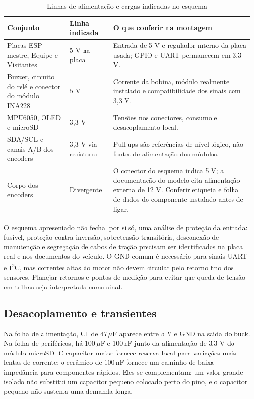 \begin{table}[htbp]\centering\small
\caption{Linhas de alimentação e cargas indicadas no esquema}\label{tab:alimentacao-modulos}
\begin{tabularx}{\textwidth}{@{}p{3.6cm}p{2.0cm}X@{}}\toprule
Conjunto & Linha indicada & O que conferir na montagem\\\midrule
Placas ESP mestre, Equipe e Visitantes & 5 V na placa & Entrada de 5 V e regulador interno da placa usada; GPIO e UART permanecem em 3,3 V.\\
Buzzer, circuito do relé e conector do módulo INA228 & 5 V & Corrente da bobina, módulo realmente instalado e compatibilidade dos sinais com 3,3 V.\\
MPU6050, OLED e microSD & 3,3 V & Tensões nos conectores, consumo e desacoplamento local.\\
SDA/SCL e canais A/B dos encoders & 3,3 V via resistores & Pull-ups são referências de nível lógico, não fontes de alimentação dos módulos.\\
Corpo dos encoders & Divergente & O conector do esquema indica 5 V; a documentação do modelo cita alimentação externa de 12 V. Conferir etiqueta e folha de dados do componente instalado antes de ligar.\\\bottomrule
\end{tabularx}\end{table}

O esquema apresentado não fecha, por si só, uma análise de proteção da entrada: fusível, proteção contra inversão, sobretensão transitória, desconexão de manutenção e segregação de cabos de tração precisam ser identificados na placa real e nos documentos do veículo. O GND comum é necessário para sinais UART e I\textsuperscript{2}C, mas correntes altas do motor não devem circular pelo retorno fino dos sensores. Planejar retornos e pontos de medição para evitar que queda de tensão em trilhas seja interpretada como sinal.

\subsection{Desacoplamento e transientes}
Na folha de alimentação, C1 de 47\,$\mu$F aparece entre 5 V e GND na saída do buck. Na folha de periféricos, há 100\,$\mu$F e 100\,nF junto da alimentação de 3,3 V do módulo microSD. O capacitor maior fornece reserva local para variações mais lentas de corrente; o cerâmico de 100\,nF fornece um caminho de baixa impedância para componentes rápidos. Eles se complementam: um valor grande isolado não substitui um capacitor pequeno colocado perto do pino, e o capacitor pequeno não sustenta uma demanda longa.

